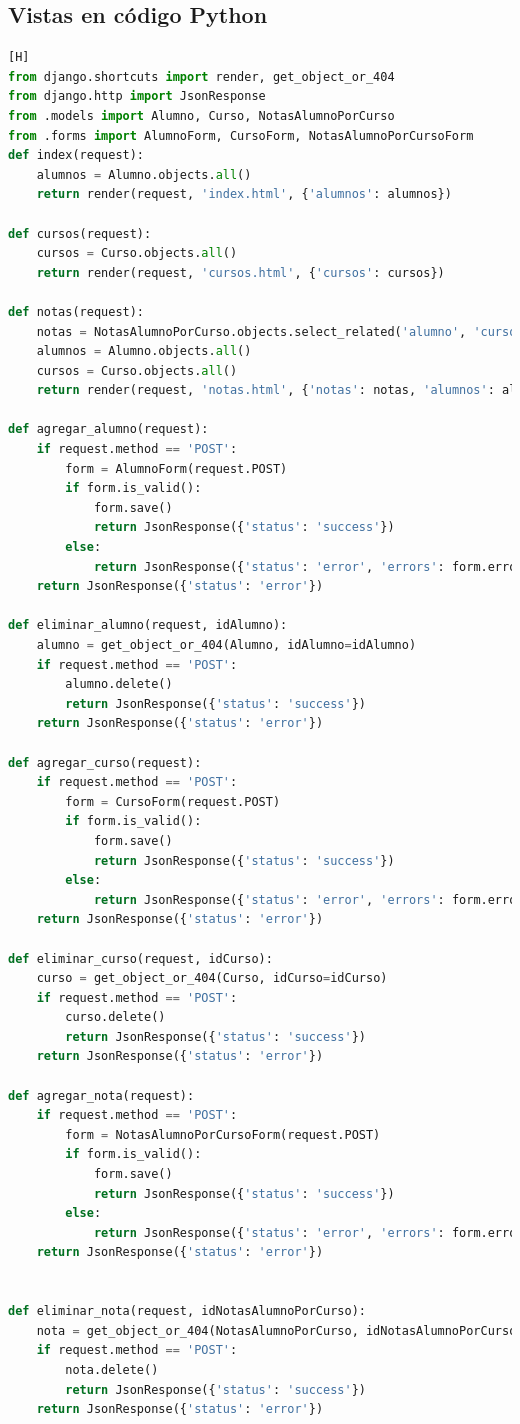 \documentclass{article}
\begin{document}
\subsection{Vistas en código Python}
		  \begin{lstlisting}[language=Python,caption={views.py}][H]
from django.shortcuts import render, get_object_or_404
from django.http import JsonResponse
from .models import Alumno, Curso, NotasAlumnoPorCurso
from .forms import AlumnoForm, CursoForm, NotasAlumnoPorCursoForm
def index(request):
    alumnos = Alumno.objects.all()
    return render(request, 'index.html', {'alumnos': alumnos})

def cursos(request):
    cursos = Curso.objects.all()
    return render(request, 'cursos.html', {'cursos': cursos})

def notas(request):
    notas = NotasAlumnoPorCurso.objects.select_related('alumno', 'curso').all()
    alumnos = Alumno.objects.all()
    cursos = Curso.objects.all()
    return render(request, 'notas.html', {'notas': notas, 'alumnos': alumnos, 'cursos': cursos})

def agregar_alumno(request):
    if request.method == 'POST':
        form = AlumnoForm(request.POST)
        if form.is_valid():
            form.save()
            return JsonResponse({'status': 'success'})
        else:
            return JsonResponse({'status': 'error', 'errors': form.errors})
    return JsonResponse({'status': 'error'})

def eliminar_alumno(request, idAlumno):
    alumno = get_object_or_404(Alumno, idAlumno=idAlumno)
    if request.method == 'POST':
        alumno.delete()
        return JsonResponse({'status': 'success'})
    return JsonResponse({'status': 'error'})

def agregar_curso(request):
    if request.method == 'POST':
        form = CursoForm(request.POST)
        if form.is_valid():
            form.save()
            return JsonResponse({'status': 'success'})
        else:
            return JsonResponse({'status': 'error', 'errors': form.errors})
    return JsonResponse({'status': 'error'})

def eliminar_curso(request, idCurso):
    curso = get_object_or_404(Curso, idCurso=idCurso)
    if request.method == 'POST':
        curso.delete()
        return JsonResponse({'status': 'success'})
    return JsonResponse({'status': 'error'})

def agregar_nota(request):
    if request.method == 'POST':
        form = NotasAlumnoPorCursoForm(request.POST)
        if form.is_valid():
            form.save()
            return JsonResponse({'status': 'success'})
        else:
            return JsonResponse({'status': 'error', 'errors': form.errors})
    return JsonResponse({'status': 'error'})


def eliminar_nota(request, idNotasAlumnoPorCurso):
    nota = get_object_or_404(NotasAlumnoPorCurso, idNotasAlumnoPorCurso=idNotasAlumnoPorCurso)
    if request.method == 'POST':
        nota.delete()
        return JsonResponse({'status': 'success'})
    return JsonResponse({'status': 'error'})

    \end{lstlisting}
\end{document}

